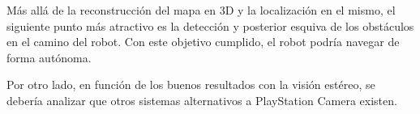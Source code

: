 

Más allá de la reconstrucción del mapa en 3D y la localización en el mismo, el
siguiente punto más atractivo es la detección y posterior esquiva de los
obstáculos en el camino del robot. Con este objetivo cumplido, el robot podría
navegar de forma autónoma.

Por otro lado, en función de los buenos resultados con la visión estéreo, se
debería analizar que otros sistemas alternativos a PlayStation Camera existen.


